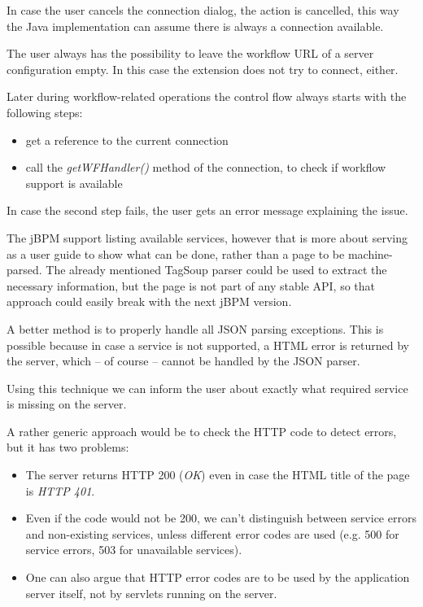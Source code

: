 In case the user cancels the connection dialog, the action is cancelled, this
way the Java implementation can assume there is always a connection available.


The user always has the possibility to leave the workflow URL of a server
configuration empty. In this case the extension does not try to connect,
either.

Later during workflow-related operations the control flow always starts with the following steps:

\begin{itemize}
\item get a reference to the current connection
\item call the \emph{getWFHandler()} method of the connection, to check if workflow support is available
\end{itemize}

In case the second step fails, the user gets an error message explaining the issue.


The jBPM support listing available services, however that is more about serving as
a user guide to show what can be done, rather than a page to be machine-parsed.
The already mentioned TagSoup parser could be used to extract the necessary
information, but the page is not part of any stable API, so that approach could
easily break with the next jBPM version.

A better method is to properly handle all JSON parsing exceptions. This is
possible because in case a service is not supported, a HTML error is returned
by the server, which -- of course -- cannot be handled by the JSON parser.

Using this technique we can inform the user about exactly what required service
is missing on the server.


A rather generic approach would be to check the HTTP code to detect errors, but it has two problems:

\begin{itemize}
\item The server returns HTTP 200 (\emph{OK}) even in case the HTML title of the page is \emph{HTTP 401}.
\item Even if the code would not be 200, we can't distinguish between service errors and non-existing services, unless different error codes are used (e.g. 500 for service errors, 503 for unavailable services).
\item One can also argue that HTTP error codes are to be used by the application server itself, not by servlets running on the server.
\end{itemize}


